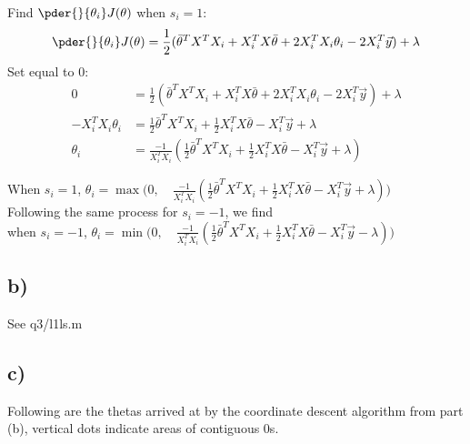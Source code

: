 \documentclass[11pt]{article}
\begin{document}
Find $\pder{}{\theta_i} J(\theta)$ when $s_i = 1$:
\begin{align*}
\pder{}{\theta_i} J(\theta) = \frac{1}{2} ( \bar{\theta}^T X^T X_i + X_i^T X \bar{\theta} + 2 X_i^T X_i \theta_i - 2 X_i^T \vec{y}) + \lambda \\
\end{align*}
Set equal to 0:
\begin{align*}
                       0 &= \frac{1}{2} ( \bar{\theta}^T X^T X_i + X_i^T X \bar{\theta} + 2 X_i^T X_i \theta_i - 2 X_i^T \vec{y}) + \lambda \\
    - X_i^T X_i \theta_i &= \frac{1}{2} \bar{\theta}^T X^T X_i + \frac{1}{2} X_i^T X \bar{\theta} - X_i^T \vec{y} + \lambda \\
                \theta_i &= \frac{-1}{X_i^T X_i} (\frac{1}{2} \bar{\theta}^T X^T X_i + \frac{1}{2} X_i^T X \bar{\theta} - X_i^T \vec{y} + \lambda)
\end{align*}

When $s_i = 1$, $\theta_i = \max\bigg(0,\quad \frac{-1}{X_i^T X_i} (\frac{1}{2} \bar{\theta}^T X^T X_i + \frac{1}{2} X_i^T X \bar{\theta} - X_i^T \vec{y} + \lambda)\bigg)$ \\

Following the same process for $s_i = -1$, we find \\

when $s_i = -1$, $\theta_i = \min\bigg(0, \quad \frac{-1}{X_i^T X_i} (\frac{1}{2} \bar{\theta}^T X^T X_i + \frac{1}{2} X_i^T X \bar{\theta} - X_i^T \vec{y} - \lambda) \bigg)$ \\

\subsection*{b)}

See q3/l1ls.m

\subsection*{c)}

Following are the thetas arrived at by the coordinate descent algorithm from part (b), vertical dots indicate areas of contiguous 0s. 
\end{document}
